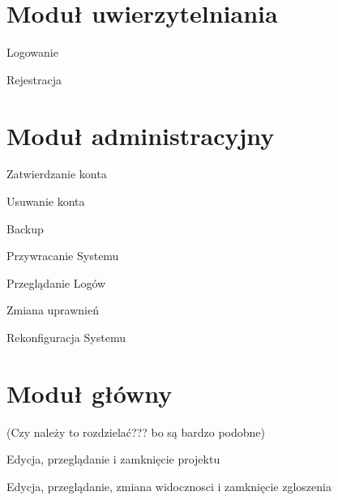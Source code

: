 \section{Moduł uwierzytelniania}

\begin{class}{Logowanie}
\end{class}

\begin{class}{Rejestracja}
\end{class}

\section{Moduł administracyjny}

\begin{class}{Zatwierdzanie konta}
\end{class}

\begin{class}{Usuwanie konta}
\end{class}

\begin{class}{Backup}
\end{class}

\begin{class}{Przywracanie Systemu}
\end{class}

\begin{class}{Przeglądanie Logów}
\end{class}

\begin{class}{Zmiana uprawnień}
\end{class}

\begin{class}{Rekonfiguracja Systemu}
\end{class}

\section{Moduł główny}
(Czy należy to rozdzielać??? bo są bardzo podobne)
\begin{class}{Edycja, przeglądanie i zamknięcie projektu}
\end{class}

\begin{class}{Edycja, przeglądanie, zmiana widocznosci i zamknięcie zgloszenia}
\end{class}



